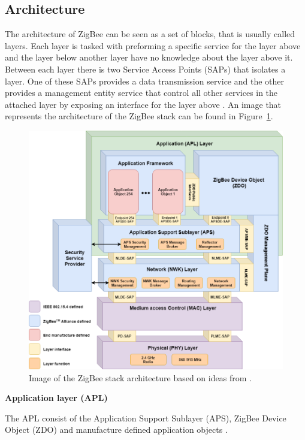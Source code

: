 \subsection{Architecture}\label{sec:architecture}
The architecture of ZigBee can be seen as a set of blocks, that is usually called layers. Each layer is tasked with preforming a specific service for the layer above and the layer below another layer have no knowledge about the layer above it. Between each layer there is two Service Access Points (SAPs) that isolates a layer. One of these SAPs provides a data transmission service and the other provides a management entity service that control all other services in the attached layer by exposing an interface for the layer above \citep{gislason2008zigbee, zigbee2007spec}. An image that represents the architecture of the ZigBee stack can be found in Figure~\ref{fig:zigBeeArch}.

\begin{figure}[ht]
\centering
\includegraphics[scale=0.46]{figure/ZigBeeStackArchitecture.png}
\caption{Image of the ZigBee stack architecture based on ideas from \citet{gislason2008zigbee, yang2014internet, zigbee2007spec}.}
\label{fig:zigBeeArch}
\end{figure}

\vspace{5mm}
\textbf{Application layer (APL)}

The APL consist of the Application Support Sublayer (APS), ZigBee Device Object (ZDO) and manufacture defined application objects \citep{zigbee2007spec}.


